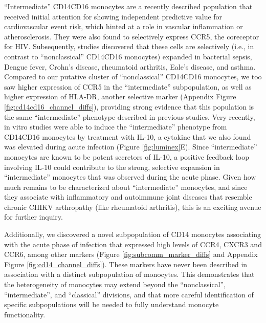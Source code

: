 “Intermediate” CD14\sups{++}\allowbreak CD16\sups{+} monocytes are a recently described population\autocite{Wong2011,Ziegler-Heitbrock2010} that received initial attention for showing independent predictive value for cardiovascular event risk,\autocite{Rogacev2012} which hinted at a role in vascular inflammation or atherosclerosis. They were also found to selectively express CCR5, the coreceptor for HIV.\autocite{Ellery2007} Subsequently, studies discovered that these cells are selectively (i.e., in contrast to “nonclassical” CD14\sups{+}\allowbreak CD16\sups{++} monocytes) expanded in bacterial sepsis, Dengue fever, Crohn’s disease, rheumatoid arthritis, Eale’s disease, and asthma.\autocite{Wong2012} Compared to our putative cluster of “nonclassical” CD14\sups{+}\allowbreak CD16\sups{++} monocytes, we too saw higher expression of CCR5 in the “intermediate” subpopulation, as well as higher expression of HLA-DR, another selective marker (Appendix Figure \ref{fig:cd14cd16_channel_diffs}), providing strong evidence that this population is the same “intermediate” phenotype described in previous studies.\autocite{Zawada2011} Very recently, in vitro studies were able to induce the “intermediate” phenotype from CD14\sups{+}\allowbreak CD16 monocytes by treatment with IL-10,\autocite{Tsukamoto2017} a cytokine that we also found was elevated during acute infection (Figure \ref{fig:luminex}E). Since “intermediate” monocytes are known to be potent secretors of IL-10,\autocite{Skrzeczynska-Moncznik2008} a positive feedback loop involving IL-10 could contribute to the strong, selective expansion in “intermediate” monocytes that was observed during the acute phase. Given how much remains to be characterized about “intermediate” monocytes, and since they associate with inflammatory and autoimmune joint diseases that resemble chronic CHIKV arthropathy (like rheumatoid arthritis), this is an exciting avenue for further inquiry.\autocite{Chaaitanya2011,Miner2015,Fingerle1993,Nakaya2012}

Additionally, we discovered a novel subpopulation of CD14\sups{+} monocytes associating with the acute phase of infection that expressed high levels of CCR4, CXCR3 and CCR6, among other markers (Figure \ref{fig:subcomm_marker_diffs} and Appendix Figure \ref{fig:cd14_channel_diffs}). These markers have never been described in association with a distinct subpopulation of monocytes. This demonstrates that the heterogeneity of monocytes may extend beyond the “nonclassical”, “intermediate”, and “classical” divisions,\autocite{Appleby2013,Ziegler-Heitbrock2013} and that more careful identification of specific subpopulations will be needed to fully understand monocyte functionality.\autocite{Stansfield2015}

